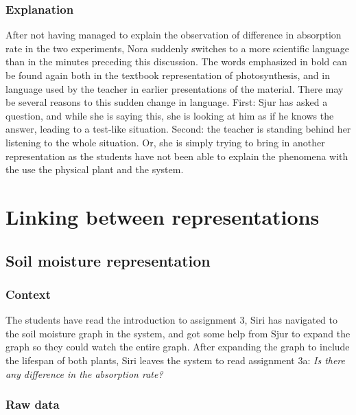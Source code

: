 \subsubsection*{Explanation}
After not having managed to explain the observation of difference in absorption rate in the two experiments, Nora suddenly switches to a more scientific language than in the minutes preceding this discussion. The words emphasized in bold can be found again both in the textbook representation of photosynthesis, and in language used by the teacher in earlier presentations of the material. There may be several reasons to this sudden change in language. First: Sjur has asked a question, and while she is saying this, she is looking at him as if he knows the answer, leading to a test-like situation. Second: the teacher is standing behind her listening to the whole situation. Or, she is simply trying to bring in another representation as the students have not been able to explain the phenomena with the use the physical plant and the system. 


\section{Linking between representations}
\subsection{Soil moisture representation}


\subsubsection*{Context}
The students have read the introduction to assignment 3, Siri has navigated to the soil moisture graph in the system, and got some help from Sjur to expand the graph so they could watch the entire graph. After expanding the graph to include the lifespan of both plants, Siri leaves the system to read assignment 3a: \emph{Is there any difference in the absorption rate?}



\subsubsection*{Raw data}

